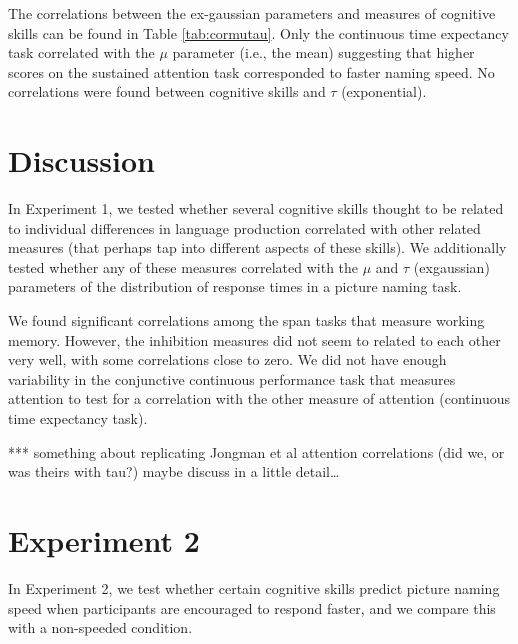 \documentclass[
  man,floatsintext]{apa6}
\begin{document}
The correlations between the ex-gaussian parameters and measures of cognitive skills can be found in Table \ref{tab:cormutau}. Only the continuous time expectancy task correlated with the \(\mu\) parameter (i.e., the mean) suggesting that higher scores on the sustained attention task corresponded to faster naming speed. No correlations were found between cognitive skills and \(\tau\) (exponential).

\hypertarget{discussion}{%
\section{Discussion}\label{discussion}}

In Experiment 1, we tested whether several cognitive skills thought to be related to individual differences in language production correlated with other related measures (that perhaps tap into different aspects of these skills). We additionally tested whether any of these measures correlated with the \(\mu\) and \(\tau\) (exgaussian) parameters of the distribution of response times in a picture naming task.

We found significant correlations among the span tasks that measure working memory. However, the inhibition measures did not seem to related to each other very well, with some correlations close to zero. We did not have enough variability in the conjunctive continuous performance task that measures attention to test for a correlation with the other measure of attention (continuous time expectancy task).

*** something about replicating Jongman et al attention correlations (did we, or was theirs with tau?) maybe discuss in a little detail\ldots{}

\hypertarget{experiment-2}{%
\section{Experiment 2}\label{experiment-2}}

In Experiment 2, we test whether certain cognitive skills predict picture naming speed when participants are encouraged to respond faster, and we compare this with a non-speeded condition.
\end{document}
